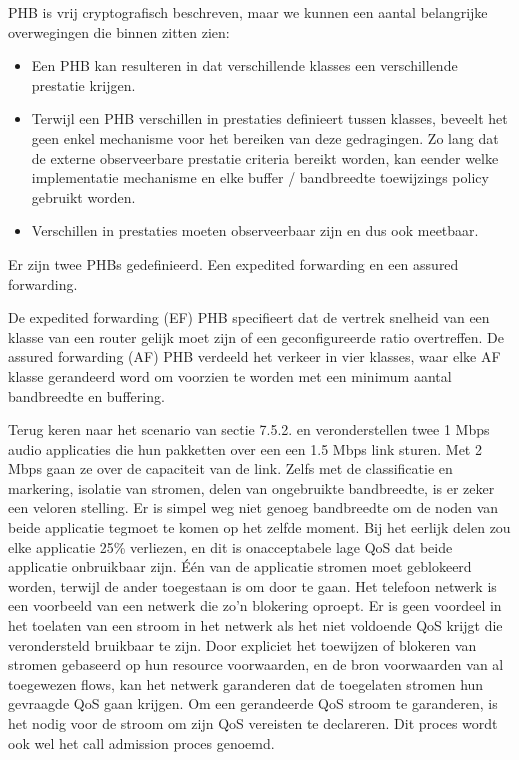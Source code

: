 PHB is vrij cryptografisch beschreven, maar we kunnen een aantal belangrijke overwegingen die binnen zitten zien:

\begin{itemize}
\item	Een PHB kan resulteren in dat verschillende klasses een verschillende prestatie krijgen.
\item	Terwijl een PHB verschillen in prestaties definieert tussen klasses, beveelt het geen enkel mechanisme voor het bereiken van deze gedragingen. Zo lang dat de externe observeerbare prestatie criteria bereikt worden, kan eender welke implementatie mechanisme en elke buffer / bandbreedte toewijzings policy gebruikt worden.
\item	Verschillen in prestaties moeten observeerbaar zijn en dus ook meetbaar.
\end{itemize}

\clearpage

\noindent Er zijn twee PHBs gedefinieerd. Een expedited forwarding en een assured forwarding.

De expedited forwarding (EF) PHB specifieert dat de vertrek snelheid van een klasse van een router gelijk moet zijn of een geconfigureerde ratio overtreffen.
De assured forwarding (AF) PHB verdeeld het verkeer in vier klasses, waar elke AF klasse gerandeerd word om voorzien te worden met een minimum aantal bandbreedte en buffering.


Terug keren naar het scenario van sectie 7.5.2. en veronderstellen twee 1 Mbps audio applicaties die hun pakketten over een een 1.5 Mbps link sturen. Met 2 Mbps gaan ze over de capaciteit van de link. Zelfs met de classificatie en markering, isolatie van stromen, delen van ongebruikte bandbreedte, is er zeker een veloren stelling. Er is simpel weg niet genoeg bandbreedte om de noden van beide applicatie tegmoet te komen op het zelfde moment. Bij het eerlijk delen zou elke applicatie 25\% verliezen, en dit is onacceptabele lage QoS dat beide applicatie onbruikbaar zijn.
Één van de applicatie stromen moet geblokeerd worden, terwijl de ander toegestaan is om door te gaan. Het telefoon netwerk is een voorbeeld van een netwerk die zo’n blokering oproept. Er is geen voordeel in het toelaten van een stroom in het netwerk als het niet voldoende QoS krijgt die verondersteld bruikbaar te zijn. Door expliciet het toewijzen of blokeren van stromen gebaseerd op hun resource voorwaarden, en de bron voorwaarden van al toegewezen flows, kan het netwerk garanderen dat de toegelaten stromen hun gevraagde QoS gaan krijgen. Om een gerandeerde QoS stroom te garanderen, is het nodig voor de stroom om zijn QoS vereisten te declareren. Dit proces wordt ook wel het call admission proces genoemd.

